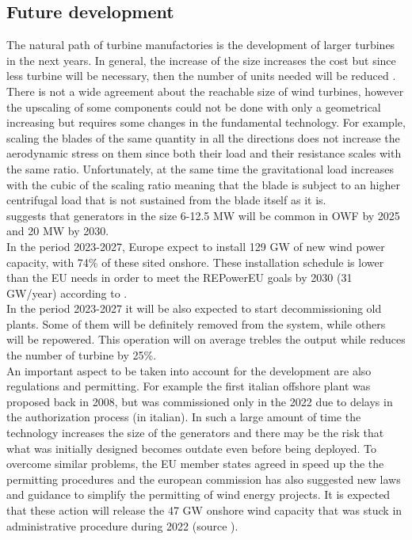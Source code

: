 \subsection{Future development}
The natural path of turbine manufactories is the development of larger turbines in the next years. In general, the increase of the size increases the cost but since less turbine will be necessary, then the number of units needed will be reduced \cite{current_staus_and_future_trends_of_offshore_wind_power_in_europe}.\\
There is not a wide agreement about the reachable size of wind turbines, however the upscaling of some components could not be done with only a geometrical increasing but requires some changes in the fundamental technology. For example, scaling the blades of the same quantity in all the directions does not increase the aerodynamic stress on them since both their load and their resistance scales with the same ratio. Unfortunately, at the same time the gravitational load increases with the cubic of the scaling ratio meaning that the blade is subject to an higher centrifugal load that is not sustained from the blade itself as it is. \\
\cite{current_staus_and_future_trends_of_offshore_wind_power_in_europe} suggests that generators in the size 6-12.5 MW will be common in OWF by 2025 and 20 MW by 2030.\\
In the period 2023-2027, Europe expect to install 129 GW of new wind power capacity, with 74\% of these sited onshore. These installation schedule is lower than the EU needs in order to meet the REPowerEU goals by 2030 (31 GW/year) according to \cite{wind_europe_data_2022}. \\
In the period 2023-2027 it will be also expected to start decommissioning old plants. Some of them will be definitely removed from the system, while others will be repowered. This operation will on average trebles the output while reduces the number of turbine by 25\%. \\
An important aspect to be taken into account for the development are also regulations and permitting. For example the first italian offshore plant was proposed back in 2008, but was commissioned only in the 2022 due to delays in the authorization process \cite{il_post} (in italian). In such a large amount of time the technology increases the size of the generators and there may be the risk that what was initially designed becomes outdate even before being deployed. To overcome similar problems, the EU member states agreed in speed up the the permitting procedures and the european commission has also suggested new laws and guidance to simplify the permitting of wind energy projects. It is expected that these action will release the 47 GW onshore wind capacity that was stuck in administrative procedure during 2022 (source \cite{wind_europe_data_2022}).  

